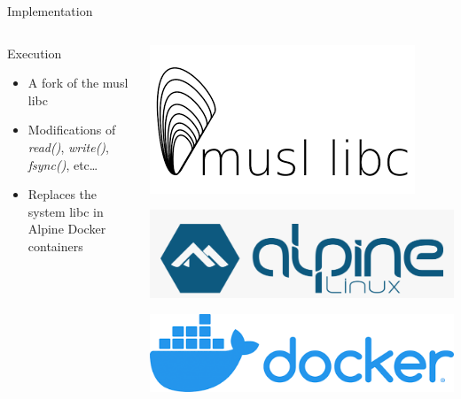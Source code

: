\documentclass[presentation]{beamer}
\begin{document}
\begin{frame}[label={sec:org1fd046a}]{Implementation}
\begin{columns}
\begin{column}{0.6\columnwidth}
\begin{block}{Execution}
\begin{itemize}
\item A fork of the musl libc\\
\item Modifications of {\color{olive}\emph{read()}}, {\color{red}\emph{write()}}, {\color{orange}\emph{fsync()}}, etc\ldots{}\\
\item Replaces the system libc in Alpine Docker containers\\
\end{itemize}
\end{block}
\end{column}

\begin{column}{0.4\columnwidth}
\begin{block}{}
\begin{center}
\includegraphics[width=.9\linewidth]{./IMGs/musl-logo.png}
\end{center}

\begin{center}
\includegraphics[width=.9\linewidth]{./IMGs/alpine-logo.png}
\end{center}

\begin{center}
\includegraphics[width=.9\linewidth]{./IMGs/docker-logo.png}
\end{center}
\end{block}
\end{column}
\end{columns}
\end{frame}
\end{document}
